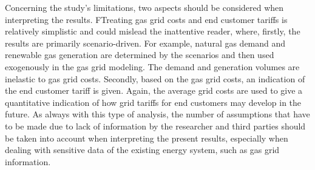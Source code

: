 Concerning the study's limitations, two aspects should be considered when interpreting the results. FTreating gas grid costs and end customer tariffs is relatively simplistic and could mislead the inattentive reader, where, firstly, the results are primarily scenario-driven. For example, natural gas demand and renewable gas generation are determined by the scenarios and then used exogenously in the gas grid modeling. The demand and generation volumes are inelastic to gas grid costs. Secondly, based on the gas grid costs, an indication of the end customer tariff is given. Again, the average grid costs are used to give a quantitative indication of how grid tariffs for end customers may develop in the future. As always with this type of analysis, the number of assumptions that have to be made due to lack of information by the researcher and third parties should be taken into account when interpreting the present results, especially when dealing with sensitive data of the existing energy system, such as gas grid information.  




























